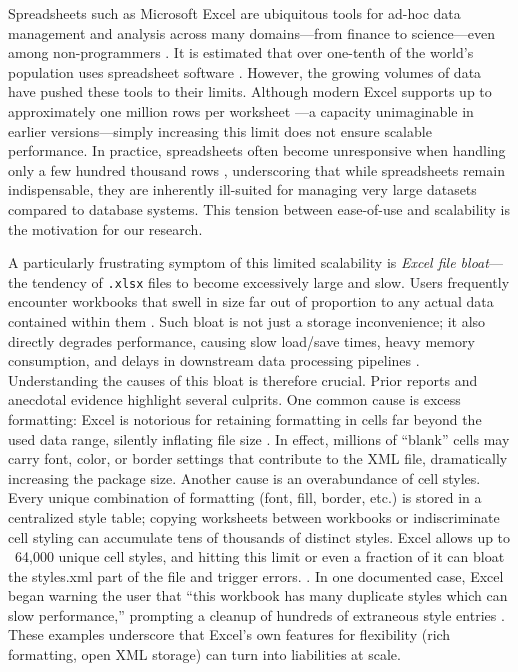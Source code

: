 \documentclass[conference]{IEEEtran}
\begin{document}
Spreadsheets such as Microsoft Excel are ubiquitous tools for ad-hoc data management and analysis across many domains—from finance to science—even among non-programmers  \cite{Bendre2015DataSpread}. It is estimated that over one-tenth of the world’s population uses spreadsheet software  \cite{Rahman2021NOAH}. However, the growing volumes of data have pushed these tools to their limits. Although modern Excel supports up to approximately one million rows per worksheet  \cite{Rahman2021NOAH, MicrosoftExcelSpecs}—a capacity unimaginable in earlier versions—simply increasing this limit does not ensure scalable performance. In practice, spreadsheets often become unresponsive when handling only a few hundred thousand rows  \cite{Bendre2015DataSpread,Budiu2019Hillview}, underscoring that while spreadsheets remain indispensable, they are inherently ill-suited for managing very large datasets compared to database systems. This tension between ease-of-use and scalability is the motivation for our research.

A particularly frustrating symptom of this limited scalability is \emph{Excel file bloat}—the tendency of \texttt{.xlsx} files to become excessively large and slow. Users frequently encounter workbooks that swell in size far out of proportion to any actual data contained within them \cite{someBloat}. Such bloat is not just a storage inconvenience; it also directly degrades performance, causing slow load/save times, heavy memory consumption, and delays in downstream data processing pipelines \cite{Mack2018Scalability}.
Understanding the causes of this bloat is therefore crucial. Prior reports and anecdotal evidence highlight several culprits. One common cause is excess formatting: Excel is notorious for retaining formatting in cells far beyond the used data range, silently inflating file size  \cite{Power2025WhyExcelFileLarge}. In effect, millions of “blank” cells may carry font, color, or border settings that contribute to the XML file, dramatically increasing the package size. Another cause is an overabundance of cell styles. Every unique combination of formatting (font, fill, border, etc.) is stored in a centralized style table; copying worksheets between workbooks or indiscriminate cell styling can accumulate tens of thousands of distinct styles. Excel allows up to ~64,000 unique cell styles, and hitting this limit or even a fraction of it can bloat the styles.xml part of the file and trigger errors.
\cite{Microsoft2024TooManyCellFormats}. In one documented case, Excel began warning the user that “this workbook has many duplicate styles which can slow performance,” prompting a cleanup of hundreds of extraneous style entries 
\cite{akira_hirai2024DuplicateStyles}. These examples underscore that Excel’s own features for flexibility (rich formatting, open XML storage) can turn into liabilities at scale.
\end{document}
